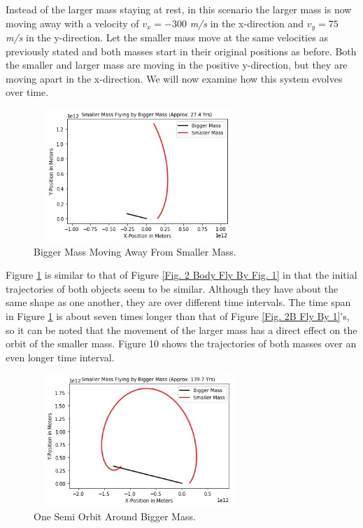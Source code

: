 \documentclass[twocolumn]{article}
\begin{document}
Instead of the larger mass staying at rest, in this scenario the larger mass is now moving away with a velocity of $v_{x}=-300$ \textit{m/s} in the x-direction and $v_{y}=75$ \textit{m/s} in the y-direction. Let the smaller mass move at the same velocities as previously stated and both masses start in their original positions as before. Both the smaller and larger mass are moving in the positive y-direction, but they are moving apart in the x-direction. We will now examine how this system evolves over time.
\begin{figure}[h]
    \centering
    \includegraphics[width=8cm, height=5cm]{Figures/2-Body Fly By (3).png}
    \caption{\small{Bigger Mass Moving Away From Smaller Mass.}}
    \label{Fig. 2 Body Fly By Fig. 3}
\end{figure}
\par \noindent
Figure \ref{Fig. 2 Body Fly By Fig. 3} is similar to that of Figure \ref{Fig. 2 Body Fly By Fig. 1} in that the initial trajectories of both objects seem to be similar. Although they have about the same shape as one another, they are over different time intervals. The time span in Figure \ref{Fig. 2 Body Fly By Fig. 3} is about seven times longer than that of Figure \ref{Fig. 2B Fly By 1}'s, so it can be noted that the movement of the larger mass has a direct effect on the orbit of the smaller mass. Figure 10 shows the trajectories of both masses over an even longer time interval.
\begin{figure}[h]
    \centering
    \includegraphics[width=8cm, height=5cm]{Figures/2-Body Fly By (4).png}
    \caption{\small{One Semi Orbit Around Bigger Mass.}}
    \label{Fig. 2 Body Fly By Fig. 4}
\end{figure}
\end{document}
